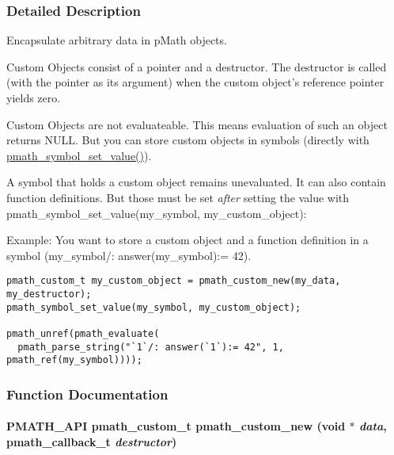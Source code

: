 \subsubsection{Detailed Description}
Encapsulate arbitrary data in pMath objects. 

Custom Objects consist of a pointer and a destructor. The destructor is called (with the pointer as its argument) when the custom object's reference pointer yields zero.

Custom Objects are not evaluateable. This means evaluation of such an object returns NULL. But you can store custom objects in symbols (directly with \hyperlink{group__symbols_g8344005c16b86be82d2efdedb0795a0c}{pmath\_\-symbol\_\-set\_\-value()}).

A symbol that holds a custom object remains unevaluated. It can also contain function definitions. But those must be set {\em after\/} setting the value with pmath\_\-symbol\_\-set\_\-value(my\_\-symbol, my\_\-custom\_\-object):

Example: You want to store a custom object and a function definition in a symbol (my\_\-symbol/: answer(my\_\-symbol):= 42). 

\begin{Code}\begin{verbatim}pmath_custom_t my_custom_object = pmath_custom_new(my_data, my_destructor);
pmath_symbol_set_value(my_symbol, my_custom_object);

pmath_unref(pmath_evaluate(
  pmath_parse_string("`1`/: answer(`1`):= 42", 1, pmath_ref(my_symbol))));
\end{verbatim}
\end{Code}

 

\subsubsection{Function Documentation}
\hypertarget{group__custom_g2ffdd4054c43b543bed1e5238ab7342c}{
\paragraph[{pmath\_\-custom\_\-new}]{\setlength{\rightskip}{0pt plus 5cm}PMATH\_\-API {\bf pmath\_\-custom\_\-t} pmath\_\-custom\_\-new (void $\ast$ {\em data}, \/  {\bf pmath\_\-callback\_\-t} {\em destructor})}\hfill}
\label{group__custom_g2ffdd4054c43b543bed1e5238ab7342c}


